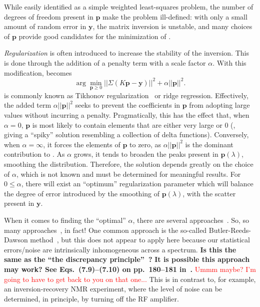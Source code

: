 While easily identified as a simple weighted least-squares problem, the number of degrees of freedom present in $\mathbf{p}$ make the problem ill-defined: with only a small amount of random error in $\mathbf{y}$, the matrix inversion is unstable, and many choices of $\mathbf{p}$ provide good candidates for the minimization of . 

\emph{Regularization} is often introduced to increase the stability of the inversion.
This is done through the addition of a penalty term with a scale factor $\alpha$.
With this modification,  becomes
%
\begin{equation}
\label{eq:rnnls}
   \arg \min_{\mathbf{p} \geq 0} || \Sigma(K \mathbf{p} - \mathbf{y}) ||^{2} + \alpha || \mathbf{p} ||^{2} .
\end{equation}
%
 is commonly known as Tikhonov regularization~\cite{1995-Tikhonov-NMSIPP} or ridge regression.
Effectively, the added term $\alpha || \mathbf{p} ||^{2}$ seeks to prevent the coefficients in $\mathbf{p}$ from adopting large values without incurring a penalty.
Pragmatically, this has the effect that, when $\alpha = 0$, $\mathbf{p}$ is most likely to contain elements that are either very large or 0 (, giving a ``spiky'' solution resembling a collection of delta functions).
Conversely, when $\alpha = \infty$, it forces the elements of $\mathbf{p}$ to zero, as $\alpha || \mathbf{p} ||^{2}$ is the dominant contribution to .
As $\alpha$ grows, it tends to broaden the peaks present in $\mathbf{p}(\lambda)$, smoothing the distribution. Therefore, the solution depends greatly on the choice of $\alpha$, which is not known  and must be determined for meaningful results. For $0 \leq \alpha$, there will exist an ``optimum'' regularization parameter which will balance the degree of error introduced by the smoothing of $\mathbf{p}(\lambda)$, with the scatter present in $\mathbf{y}$.

When it comes to finding the ``optimal'' $\alpha$, there are several approaches~\cite{2001-Kilmer-SIAMJMAA-22-1204}.
So, so many approaches~\cite{2011-Bauer-MCS-81-1795}, in fact!
One common approach is the so-called Butler-Reeds-Dawson method~\cite{1981-Butler-SIAMJNMA-18-381}, but this does not appear to apply here because our statistical errors/noise are intrinsically inhomogeneous across a spectrum.
\textbf{Is this the same as the ``the discrepancy principle''~\cite{1966-Morozon-DANSSR-167-510}?}
\textbf{It is possible this approach may work? See Eqs.~(7.9)--(7.10) on pp.~180--181 in~\cite{1998-Hansen-RDDIPP}.}
\textcolor{red}{Ummm maybe? I'm going to have to get back to you on that one...}
This is in contrast to, for example, an inversion-recovery NMR experiment, where the level of noise can be determined, in principle, by turning off the RF amplifier.

